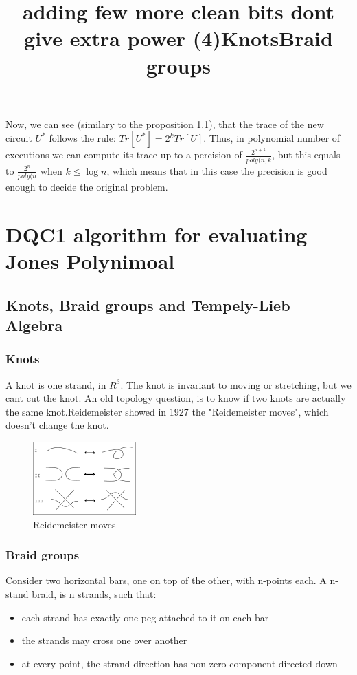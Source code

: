 \documentclass{article}
\begin{document}
{\title{adding few more clean bits dont give extra power (4)}
Now, we can see (similary to the proposition 1.1), that the trace of the new circuit \(U^{*}\) follows the rule: \(Tr[U^{*}] = 2^{k}Tr[U]\). Thus, in polynomial number of executions we can compute its trace up to a percision of \(\frac{2^{n+k}}{poly(n,k}\), but this equals to \(\frac{2^{n}}{poly(n}\) when \(k  \leq \log{n}\), which means that in this case the precision is good enough to decide the original problem.



\section{DQC1 algorithm for evaluating Jones Polynimoal}
\subsection{Knots, Braid groups and Tempely-Lieb Algebra}
\subsubsection{Knots}
\title{Knots}
A knot is one strand, in \(R^3\). The knot is invariant to moving or stretching, but we cant cut the knot.
An old topology question, is to know if two knots are actually the same knot.Reidemeister showed in 1927
the "Reidemeister moves", which doesn't change the knot.
\begin{figure}
\includegraphics[scale=0.5]{Reidemeister} 
\caption{Reidemeister moves}
\end{figure}

  
\subsubsection{Braid groups}
\title{Braid groups}
\begin{definition}
Consider two horizontal bars, one on top of the other, with n-points each. A n-stand braid, is
n strands, such that:
\begin{itemize}
\item each strand has exactly one peg attached to it on each bar
\item the strands may cross one over another
\item at every point, the strand direction has non-zero component directed down 
\end{itemize}
\end{definition}

}
\end{document}
